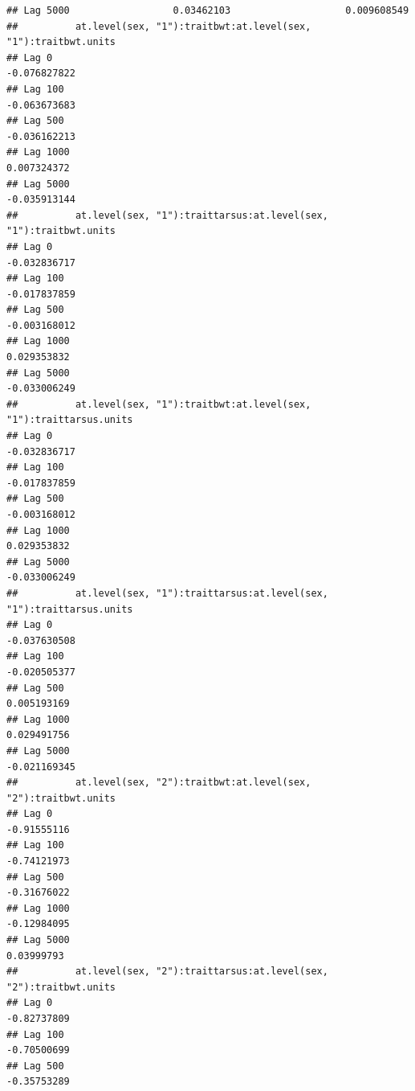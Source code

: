 \documentclass[
  12pt,
]{book}
\begin{document}
\begin{verbatim}
## Lag 5000                  0.03462103                    0.009608549
##          at.level(sex, "1"):traitbwt:at.level(sex, "1"):traitbwt.units
## Lag 0                                                     -0.076827822
## Lag 100                                                   -0.063673683
## Lag 500                                                   -0.036162213
## Lag 1000                                                   0.007324372
## Lag 5000                                                  -0.035913144
##          at.level(sex, "1"):traittarsus:at.level(sex, "1"):traitbwt.units
## Lag 0                                                        -0.032836717
## Lag 100                                                      -0.017837859
## Lag 500                                                      -0.003168012
## Lag 1000                                                      0.029353832
## Lag 5000                                                     -0.033006249
##          at.level(sex, "1"):traitbwt:at.level(sex, "1"):traittarsus.units
## Lag 0                                                        -0.032836717
## Lag 100                                                      -0.017837859
## Lag 500                                                      -0.003168012
## Lag 1000                                                      0.029353832
## Lag 5000                                                     -0.033006249
##          at.level(sex, "1"):traittarsus:at.level(sex, "1"):traittarsus.units
## Lag 0                                                           -0.037630508
## Lag 100                                                         -0.020505377
## Lag 500                                                          0.005193169
## Lag 1000                                                         0.029491756
## Lag 5000                                                        -0.021169345
##          at.level(sex, "2"):traitbwt:at.level(sex, "2"):traitbwt.units
## Lag 0                                                      -0.91555116
## Lag 100                                                    -0.74121973
## Lag 500                                                    -0.31676022
## Lag 1000                                                   -0.12984095
## Lag 5000                                                    0.03999793
##          at.level(sex, "2"):traittarsus:at.level(sex, "2"):traitbwt.units
## Lag 0                                                         -0.82737809
## Lag 100                                                       -0.70500699
## Lag 500                                                       -0.35753289

\end{verbatim}
\end{document}
